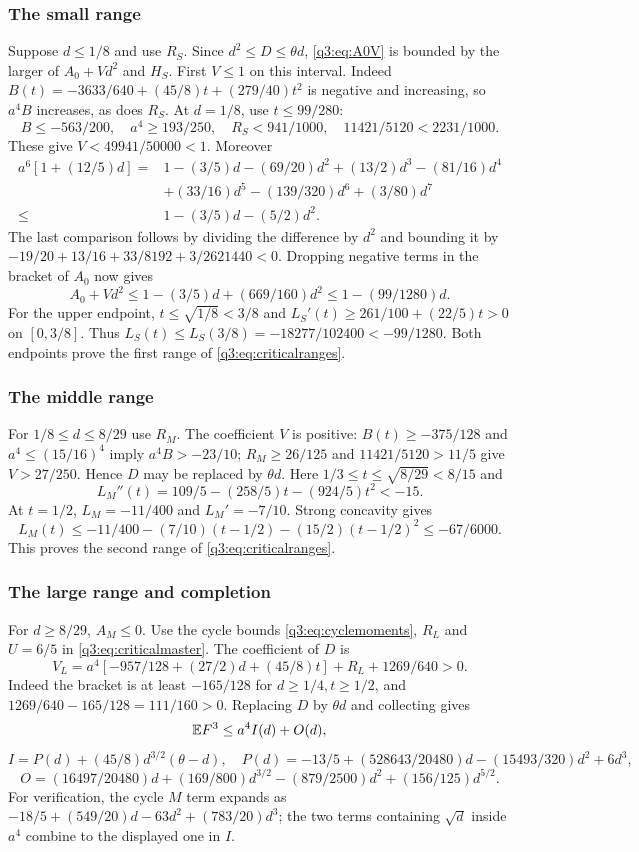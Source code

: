 \subsubsection{The small range}
Suppose $d\le1/8$ and use $R_S$. Since $d^2\le D\le\theta d$, \eqref{q3:eq:A0V} is bounded by the larger of $A_0+Vd^2$ and $H_S$.
First $V\le1$ on this interval. Indeed
$B(t)=-3633/640+(45/8)t+(279/40)t^2$ is negative and increasing, so $a^4B$ increases, as does $R_S$. At $d=1/8$, use $t\le99/280$:
\[
 B\le-563/200,\quad a^4\ge193/250,\quad
 R_S<941/1000,\quad11421/5120<2231/1000.
\]
These give $V<49941/50000<1$.
Moreover
\[
 \begin{aligned}
 a^6[1+(12/5)d]
 ={}&1-(3/5)d-(69/20)d^2+(13/2)d^3-(81/16)d^4\\
 &+(33/16)d^5-(139/320)d^6+(3/80)d^7\\
 \le{}&1-(3/5)d-(5/2)d^2 .
 \end{aligned}
\]
The last comparison follows by dividing the difference by $d^2$ and bounding it by
$-19/20+13/16+33/8192+3/2621440<0$.
Dropping negative terms in the bracket of $A_0$ now gives
\[
 A_0+Vd^2\le1-(3/5)d+(669/160)d^2\le1-(99/1280)d.
\]
For the upper endpoint, $t\le\sqrt{1/8}<3/8$ and
$L_S'(t)\ge261/100+(22/5)t>0$ on $[0,3/8]$.
Thus $L_S(t)\le L_S(3/8)=-18277/102400<-99/1280$.
Both endpoints prove the first range of \eqref{q3:eq:criticalranges}.

\subsubsection{The middle range}
For $1/8\le d\le8/29$ use $R_M$. The coefficient $V$ is positive:
$B(t)\ge-375/128$ and $a^4\le(15/16)^4$ imply $a^4B>-23/10$;
$R_M\ge26/125$ and $11421/5120>11/5$ give $V>27/250$.
Hence $D$ may be replaced by $\theta d$.
Here $1/3\le t\le\sqrt{8/29}<8/15$ and
\[
 L_M''(t)=109/5-(258/5)t-(924/5)t^2<-15.
\]
At $t=1/2$, $L_M=-11/400$ and $L_M'=-7/10$. Strong concavity gives
\[
 L_M(t)\le-11/400-(7/10)(t-1/2)-(15/2)(t-1/2)^2
 \le-67/6000 .
\]
This proves the second range of \eqref{q3:eq:criticalranges}.

\subsubsection{The large range and completion}
For $d\ge8/29$, $A_M\le0$. Use the cycle bounds \eqref{q3:eq:cyclemoments}, $R_L$ and $U=6/5$ in \eqref{q3:eq:criticalmaster}. The coefficient of $D$ is
\[
 V_L=a^4[-957/128+(27/2)d+(45/8)t]+R_L+1269/640>0 .
\]
Indeed the bracket is at least $-165/128$ for $d\ge1/4,t\ge1/2$,
and $1269/640-165/128=111/160>0$.
Replacing $D$ by $\theta d$ and collecting gives
\[
 \mathbb E F^3\le a^4I(d)+O(d),
\]
\[
 I=P(d)+(45/8)d^{3/2}(\theta-d),\quad
 P(d)=-13/5+(528643/20480)d-(15493/320)d^2+6d^3,
\]
\[
 O=(16497/20480)d+(169/800)d^{3/2}-(879/2500)d^2+(156/125)d^{5/2}.
\]
For verification, the cycle $M$ term expands as
$-18/5+(549/20)d-63d^2+(783/20)d^3$; the two terms containing $\sqrt d$ inside $a^4$ combine to the displayed one in $I$.

